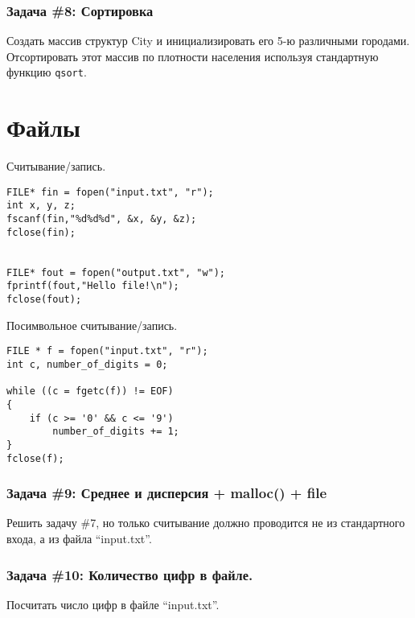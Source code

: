 \documentclass{article}
\begin{document}
\subsubsection*{\Squarepipe \quad Задача \#8: Сортировка}
Создать массив структур City и инициализировать его 5-ю различными городами. Отсортировать этот массив по плотности населения используя стандартную функцию \texttt{qsort}.
\section*{Файлы}
\begin{multicols}{2}
Считывание/запись.
\begin{lstlisting}
FILE* fin = fopen("input.txt", "r");
int x, y, z;
fscanf(fin,"%d%d%d", &x, &y, &z);
fclose(fin);


FILE* fout = fopen("output.txt", "w");
fprintf(fout,"Hello file!\n");
fclose(fout);
\end{lstlisting}
Посимвольное считывание/запись.
\begin{lstlisting}
FILE * f = fopen("input.txt", "r");
int c, number_of_digits = 0;

while ((c = fgetc(f)) != EOF)
{
    if (c >= '0' && c <= '9')
        number_of_digits += 1;
}
fclose(f);
\end{lstlisting}
\end{multicols}
\subsubsection*{\Squarepipe \quad Задача \#9: Среднее и дисперсия + malloc() + file}
Решить задачу \#7, но только считывание должно проводится не из стандартного входа, а из файла ``input.txt''.
\subsubsection*{\Squarepipe \quad Задача \#10: Количество цифр в файле.}
Посчитать число цифр в файле ``input.txt''.
\end{document}
